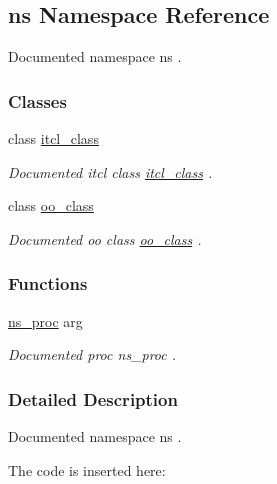 \hypertarget{namespacens}{}\subsection{ns Namespace Reference}
\label{namespacens}


Documented namespace {\ttfamily ns} .  


\subsubsection*{Classes}
\begin{DoxyCompactItemize}
\item 
class \mbox{\hyperlink{classns_1_1itcl__class}{itcl\+\_\+class}}
\begin{DoxyCompactList}\small\item\em Documented itcl class {\ttfamily \mbox{\hyperlink{classns_1_1itcl__class}{itcl\+\_\+class}}} . \end{DoxyCompactList}\item 
class \mbox{\hyperlink{classns_1_1oo__class}{oo\+\_\+class}}
\begin{DoxyCompactList}\small\item\em Documented oo class {\ttfamily \mbox{\hyperlink{classns_1_1oo__class}{oo\+\_\+class}}} . \end{DoxyCompactList}\end{DoxyCompactItemize}
\subsubsection*{Functions}
\begin{DoxyCompactItemize}
\item 
\mbox{\hyperlink{namespacens_a1429cbe84d32b17ea4783e5c5c00615b}{ns\+\_\+proc}} arg
\begin{DoxyCompactList}\small\item\em Documented proc {\ttfamily ns\+\_\+proc} . \end{DoxyCompactList}\end{DoxyCompactItemize}


\subsubsection{Detailed Description}
Documented namespace {\ttfamily ns} . 

The code is inserted here\+:


